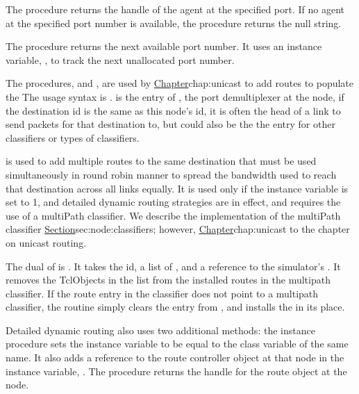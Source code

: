 The procedure  %
returns the handle of the
agent at the specified port.
If no agent at the specified port number is available, the procedure returns
the null string.

The procedure  returns the next available port number.
It uses an instance variable, ,
to track the next unallocated port number.

The procedures,  and ,
are used by \href{unicast routing}{Chapter}{chap:unicast}
to add routes to populate the 
The usage syntax is
. %
 is the entry of , the port demultiplexer
at the node, if the destination id is the same as this node's id,
it is often the head of a link to send packets for that destination to,
but could also be the the entry for other classifiers or types of classifiers.

is used to add multiple routes to the same destination that must be used
simultaneously in round robin manner to spread the bandwidth used to reach
that destination across all links equally.
It is used only if the instance variable  is set to 1,
and detailed dynamic routing strategies are in effect,
and requires the use of a multiPath classifier.
We describe the implementation of the multiPath classifier
\href{later in this chapter}{Section}{sec:node:classifiers};
however, \href{we defer the discussion of multipath
routing}{Chapter}{chap:unicast} to the chapter on unicast routing.

The dual of  is .
It takes the id, a list of , and a reference to
the simulator's .
It removes the TclObjects in the list from the installed routes in the
multipath classifier.
If the route entry in the classifier does not point to a multipath
classifier,
the routine simply clears the entry from , and
installs the  in its place.

Detailed dynamic routing also uses two additional methods:
the instance procedure  sets the instance variable
 to be equal to the class variable of the same name.
It also adds a reference to the route controller object at that node
in the instance variable, .
The procedure  returns the handle for the route object 
at the node.

